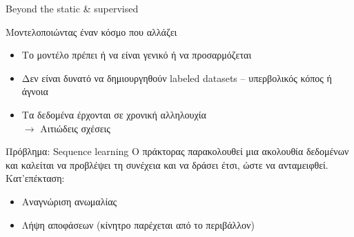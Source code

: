 \documentclass[11pt,center]{beamer}
\begin{document}
\begin{frame}{Beyond the static \& supervised}
  \begin{block}{Μοντελοποιώντας έναν κόσμο που αλλάζει}
	\pause
	\vspace{-0.5em}
	\begin{itemize}
	  \item Το μοντέλο πρέπει ή να είναι γενικό ή να προσαρμόζεται
	  \item Δεν είναι δυνατό να δημιουργηθούν labeled datasets -- υπερβολικός κόπος ή άγνοια
	  \pause
	  \item Τα δεδομένα έρχονται σε χρονική αλληλουχία \\ $\rightarrow$ Αιτιώδεις σχέσεις
	\end{itemize}
  \end{block}

  \pause
  \vspace{-0.5em}
  \begin{block}{Πρόβλημα: Sequence learning}
	Ο πράκτορας παρακολουθεί μια ακολουθία δεδομένων και καλείται να προβλέψει τη συνέχεια και να δράσει έτσι, ώστε να ανταμειφθεί. \\
	Κατ'επέκταση:
	\vspace{-0.3em}
	\begin{itemize}
	  \item Αναγνώριση ανωμαλίας
	  \item Λήψη αποφάσεων (κίνητρο παρέχεται από το περιβάλλον)
	\end{itemize}
  \end{block}
\end{frame}
\end{document}
